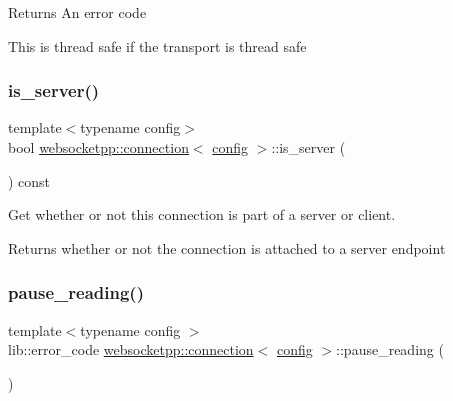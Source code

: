 \begin{DoxyReturn}{Returns}
An error code
\end{DoxyReturn}
This is thread safe if the transport is thread safe \mbox{\label{classwebsocketpp_1_1connection_ab248ee632b5b4d9998fec4328510f445}} 
\subsubsection{\texorpdfstring{is\+\_\+server()}{is\_server()}}
{\footnotesize\ttfamily template$<$typename config$>$ \\
bool \mbox{\hyperlink{classwebsocketpp_1_1connection}{websocketpp\+::connection}}$<$ \mbox{\hyperlink{classconfig}{config}} $>$\+::is\+\_\+server (\begin{DoxyParamCaption}{ }\end{DoxyParamCaption}) const\hspace{0.3cm}{\ttfamily [inline]}}



Get whether or not this connection is part of a server or client. 

\begin{DoxyReturn}{Returns}
whether or not the connection is attached to a server endpoint 
\end{DoxyReturn}
\mbox{\label{classwebsocketpp_1_1connection_ad6a4a25a18ec61d2a36a149a3d92ab72}} 
\subsubsection{\texorpdfstring{pause\+\_\+reading()}{pause\_reading()}}
{\footnotesize\ttfamily template$<$typename config $>$ \\
lib\+::error\+\_\+code \mbox{\hyperlink{classwebsocketpp_1_1connection}{websocketpp\+::connection}}$<$ \mbox{\hyperlink{classconfig}{config}} $>$\+::pause\+\_\+reading (\begin{DoxyParamCaption}{ }\end{DoxyParamCaption})}



